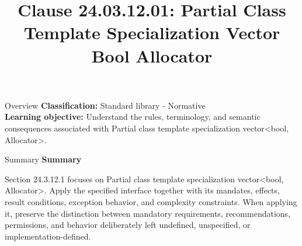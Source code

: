 \documentclass[10pt,letterpaper]{article}
\title{Clause 24.03.12.01: Partial Class Template Specialization Vector Bool Allocator}
\author{}
\date{}
\begin{document}
\maketitle
\begin{CornellOverviewBox}{Overview}
\textbf{Classification:} Standard library - Normative\\[2pt]
\textbf{Learning objective:} Understand the rules, terminology, and semantic consequences associated with Partial class template specialization vector<bool, Allocator>.
\end{CornellOverviewBox}\begin{CornellSummaryBox}{Summary}
{\sffamily\bfseries\color{Accent} Summary}\par\vspace{3pt}Section 24.3.12.1 focuses on Partial class template specialization vector<bool, Allocator>. Apply the specified interface together with its mandates, effects, result conditions, exception behavior, and complexity constraints. When applying it, preserve the distinction between mandatory requirements, recommendations, permissions, and behavior deliberately left undefined, unspecified, or implementation-defined.
\end{CornellSummaryBox}
\end{document}
